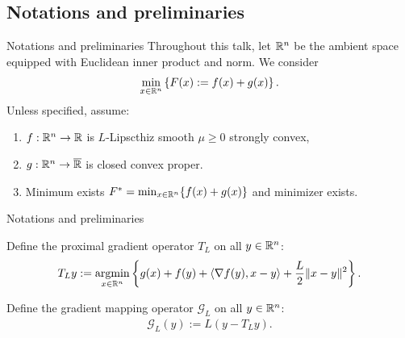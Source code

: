 \documentclass[11pt]{beamer}
\theoremstyle{definition}
\begin{document}
    \subsection{Notations and preliminaries}
        \begin{frame}{Notations and preliminaries}
            Throughout this talk, let $\mathbb R^n$ be the ambient space equipped with Euclidean inner product and norm. 
            We consider 
            \begin{align}\label{eqn:additive-comp-obj}
                \min_{x \in \mathbb R^n} \left\lbrace
                    F(x):= f(x) + g(x)
                \right\rbrace.
            \end{align}
            Unless specified, assume: 
            \begin{enumerate}
                \item $f:\mathbb R^n \rightarrow \mathbb R$ is $L$-Lipscthiz smooth $\mu \ge 0$ strongly convex, 
                \item $g:\mathbb R^n \rightarrow \overline {\mathbb R}$ is closed convex proper. 
                \item Minimum exists $F^* = \min_{x\in \mathbb R^n}\{f(x) + g(x)\}$ and minimizer exists. 
            \end{enumerate}
        \end{frame}
        \begin{frame}{Notations and preliminaries}
            \begin{definition}\label{def:proximal-gradient-operator}
                Define the proximal gradient operator $T_L$ on all $y \in \mathbb R^n$: 
                \begin{align*}
                    T_L y := \mathop{\rm argmin}\limits_{x \in \mathbb R^n} \left\lbrace
                        g(x) + f(y) + \langle \nabla f(y), x - y\rangle 
                        + \frac{L}{2}\Vert x- y \Vert^2
                    \right\rbrace. 
                \end{align*}
            \end{definition}
            \begin{definition}\label{def:gradient-mapping-operator}
                Define the gradient mapping operator $\mathcal G_L$ on all $y \in \mathbb R^n$: 
                \begin{align*}
                    \mathcal G_L (y):= L(y - T_L y). 
                \end{align*}
            \end{definition}
        \end{frame}
\end{document}
